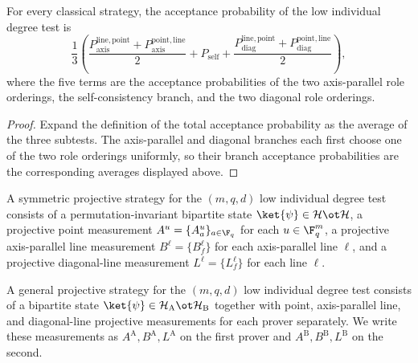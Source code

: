 \begin{lemma}\label{fig:test}
	\leanok
	For every classical strategy, the acceptance probability of the low individual degree test is
	\[
		\frac13\left(\frac{P^{\mathrm{line,point}}_{\mathrm{axis}}+P^{\mathrm{point,line}}_{\mathrm{axis}}}{2}
		+P_{\mathrm{self}}
		+\frac{P^{\mathrm{line,point}}_{\mathrm{diag}}+P^{\mathrm{point,line}}_{\mathrm{diag}}}{2}\right),
	\]
	where the five terms are the acceptance probabilities of the two axis-parallel role orderings, the self-consistency branch, and the two diagonal role orderings.
\end{lemma}
\begin{proof}
	\leanok
	Expand the definition of the total acceptance probability as the average of
	the three subtests.  The axis-parallel and diagonal branches each first
	choose one of the two role orderings uniformly, so their branch acceptance
	probabilities are the corresponding averages displayed above.
\end{proof}

\begin{definition}\label{def:symmetric-projective-strategy}
	\leanok
	A symmetric projective strategy for the $(m,q,d)$ low individual degree test consists of a permutation-invariant bipartite state $\ket{\psi} \in \mathcal H \ot \mathcal H$, a projective point measurement $A^u=\{A^u_a\}_{a \in \F_q}$ for each $u \in \F_q^m$, a projective axis-parallel line measurement $B^\ell=\{B^\ell_f\}$ for each axis-parallel line $\ell$, and a projective diagonal-line measurement $L^\ell=\{L^\ell_f\}$ for each line $\ell$.
\end{definition}

\begin{definition}\label{def:projective-strategy}
	\leanok
	A general projective strategy for the $(m,q,d)$ low individual degree test consists of a bipartite state $\ket{\psi} \in \mathcal H_{\mathrm A} \ot \mathcal H_{\mathrm B}$ together with point, axis-parallel line, and diagonal-line projective measurements for each prover separately. We write these measurements as $A^{\mathrm A}, B^{\mathrm A}, L^{\mathrm A}$ on the first prover and $A^{\mathrm B}, B^{\mathrm B}, L^{\mathrm B}$ on the second.
\end{definition}

